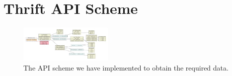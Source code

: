 \chapter{Thrift API Scheme}

\begin{figure}
    \centering
    \includegraphics[angle=-90, origin=c, width=0.40\textwidth]{Figures/thrift/Rs-ex.pdf}
    \caption{The API scheme we have implemented to obtain the required data.}
    \label{fA.1}
\end{figure}

